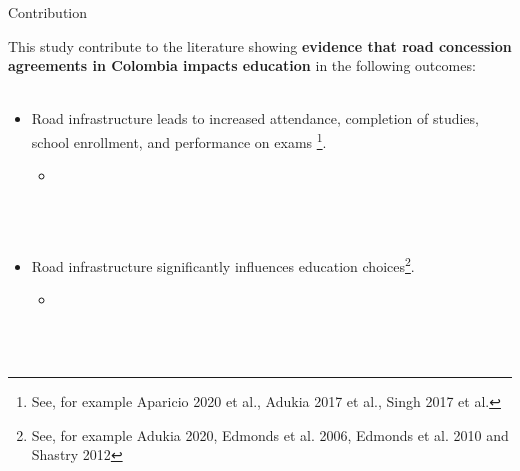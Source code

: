 \documentclass[9pt]{beamer}
\begin{document}

\begin{frame}{Contribution \hyperlink{rev.literature}{} }
     \label{contribution}
     
This study contribute to the literature showing \textbf{evidence that road concession agreements in Colombia impacts education} in the following outcomes:\\~\\

\begin{itemize}
   \item Road infrastructure leads to increased attendance, completion of studies, school enrollment, and performance on exams \footnote{\footnotesize See, for example Aparicio 2020 et al., Adukia 2017 et al.,  Singh 2017 et al.}.  
   
        \begin{itemize}
              \item[]
        \end{itemize}
\\~\\
 
   \item Road infrastructure significantly influences education choices\footnote{\footnotesize See, for example  Adukia 2020,   Edmonds et al. 2006, Edmonds et al. 2010 and Shastry 2012}.     %
        \begin{itemize}
              \item[]
        \end{itemize}
 
\\~\\
 

 

 
  \end{itemize}
\end{frame}
\end{document}
